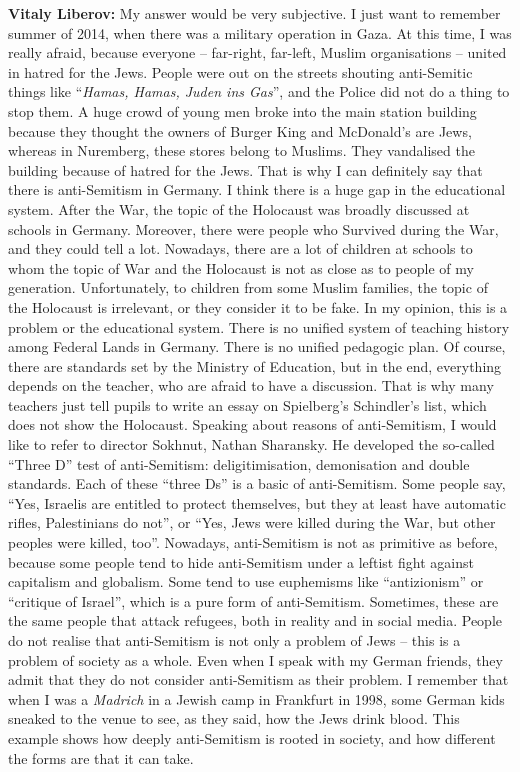 \textbf{Vitaly Liberov:} My answer would be very subjective. I just want to remember summer of 2014, when there was a military operation in Gaza. At this time, I was really afraid, because everyone – far-right, far-left, Muslim organisations – united in hatred for the Jews. People were out on the streets shouting anti-Semitic things like “\textit{Hamas, Hamas, Juden ins Gas}”, and the Police did not do a thing to stop them. A huge crowd of young men broke into the main station building because they thought the owners of Burger King and McDonald’s are Jews, whereas in Nuremberg, these stores belong to Muslims. They vandalised the building because of hatred for the Jews. That is why I can definitely say that there is anti-Semitism in Germany. I think there is a huge gap in the educational system. After the War, the topic of the Holocaust was broadly discussed at schools in Germany. Moreover, there were people who Survived during the War, and they could tell a lot. Nowadays, there are a lot of children at schools to whom the topic of War and the Holocaust is not as close as to people of my generation. Unfortunately, to children from some Muslim families, the topic of the Holocaust is irrelevant, or they consider it to be fake. In my opinion, this is a problem or the educational system. There is no unified system of teaching history among Federal Lands in Germany. There is no unified pedagogic plan. Of course, there are standards set by the Ministry of Education, but in the end, everything depends on the teacher, who are afraid to have a discussion. That is why many teachers just tell pupils to write an essay on Spielberg’s Schindler’s list, which does not show the Holocaust. Speaking about reasons of anti-Semitism, I would like to refer to director Sokhnut, Nathan Sharansky. He developed the so-called “Three D” test of anti-Semitism: deligitimisation, demonisation and double standards. Each of these “three Ds” is a basic of anti-Semitism. Some people say, “Yes, Israelis are entitled to protect themselves, but they at least have automatic rifles, Palestinians do not”, or “Yes, Jews were killed during the War, but other peoples were killed, too”. Nowadays, anti-Semitism is not as primitive as before, because some people tend to hide anti-Semitism under a leftist fight against capitalism and globalism. Some tend to use euphemisms like “antizionism” or “critique of Israel”, which is a pure form of anti-Semitism. Sometimes, these are the same people that attack refugees, both in reality and in social media. People do not realise that anti-Semitism is not only a problem of Jews – this is a problem of society as a whole. Even when I speak with my German friends, they admit that they do not consider anti-Semitism as their problem. I remember that when I was a \textit{Madrich} in a Jewish camp in Frankfurt in 1998, some German kids sneaked to the venue to see, as they said, how the Jews drink blood. This example shows how deeply anti-Semitism is rooted in society, and how different the forms are that it can take.  


